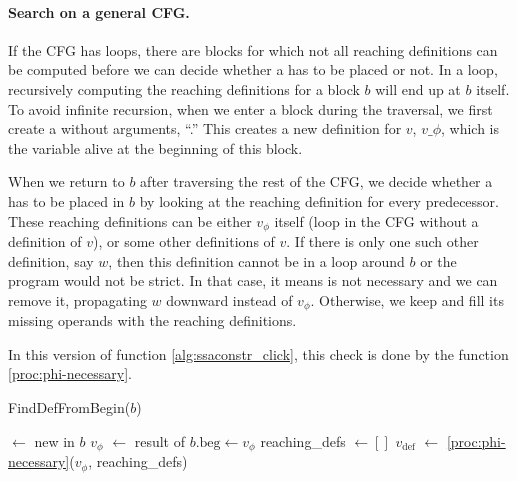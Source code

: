 {\paragraph{Search on a general CFG.}
If the CFG has loops, there are blocks for which not all reaching definitions can be computed before we can decide whether a \phifun has to be placed or not.
In a loop, recursively computing the reaching definitions for a block $b$ will end up at $b$ itself.
To avoid infinite recursion, when we enter a block during the traversal, we first create a \phifun without arguments, ``\pendphi.''
This creates a new definition for $v$, $v\_\phi$, which is the variable alive at the beginning of this block.


When we return to $b$ after traversing the rest of the CFG, we decide whether a \phifun has to be placed in $b$ by looking at the reaching definition for every predecessor.
These reaching definitions can be either $v_\phi$ itself (loop in the CFG without a definition of $v$), or some other definitions of $v$.
If there is only one such other definition, say $w$, then this definition cannot be in a loop around $b$ or the program would not be strict.
In that case, it means \pendphi is not necessary and we can remove it, propagating $w$ downward instead of $v_\phi$. Otherwise, we keep \pendphi and fill its missing operands with the reaching definitions.

In this version of function \ref{alg:ssaconstr_click}, this check is done by the function \ref{proc:phi-necessary}.

\begin{procedure}
  \caption{FindDefFromBegin($b$)}
  \label{proc:find-def-from-begin}
  \label{alg:ssaconstr_click}
  \pendphi $\gets$ new \phifun in $b$\;
  $v_\phi$ $\gets$ result of \pendphi\;
  $b.\mbox{beg} \gets v_\phi$\;
  reaching\_defs $\gets []$\;
  $v_\textrm{def}$ $\gets$ \ref{proc:phi-necessary}($v_\phi$, reaching\_defs)\;
\end{procedure}

}
